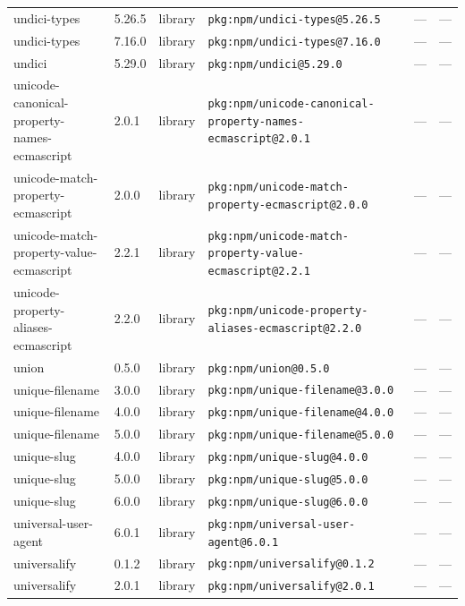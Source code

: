 \documentclass[11pt,a4paper]{article}
\begin{document}
\begin{longtable}{|p{4cm}|p{2cm}|p{1.6cm}|p{5cm}|p{1.5cm}|p{3.5cm}|}
\raggedright undici-types & 5.26.5 & library & \small\texttt{pkg:npm/undici-types@5.26.5} & — & \small — \\
\raggedright undici-types & 7.16.0 & library & \small\texttt{pkg:npm/undici-types@7.16.0} & — & \small — \\
\raggedright undici & 5.29.0 & library & \small\texttt{pkg:npm/undici@5.29.0} & — & \small — \\
\raggedright unicode-canonical-property-names-ecmascript & 2.0.1 & library & \small\texttt{pkg:npm/unicode-canonical-property-names-ecmascript@2.0.1} & — & \small — \\
\raggedright unicode-match-property-ecmascript & 2.0.0 & library & \small\texttt{pkg:npm/unicode-match-property-ecmascript@2.0.0} & — & \small — \\
\raggedright unicode-match-property-value-ecmascript & 2.2.1 & library & \small\texttt{pkg:npm/unicode-match-property-value-ecmascript@2.2.1} & — & \small — \\
\raggedright unicode-property-aliases-ecmascript & 2.2.0 & library & \small\texttt{pkg:npm/unicode-property-aliases-ecmascript@2.2.0} & — & \small — \\
\raggedright union & 0.5.0 & library & \small\texttt{pkg:npm/union@0.5.0} & — & \small — \\
\raggedright unique-filename & 3.0.0 & library & \small\texttt{pkg:npm/unique-filename@3.0.0} & — & \small — \\
\raggedright unique-filename & 4.0.0 & library & \small\texttt{pkg:npm/unique-filename@4.0.0} & — & \small — \\
\raggedright unique-filename & 5.0.0 & library & \small\texttt{pkg:npm/unique-filename@5.0.0} & — & \small — \\
\raggedright unique-slug & 4.0.0 & library & \small\texttt{pkg:npm/unique-slug@4.0.0} & — & \small — \\
\raggedright unique-slug & 5.0.0 & library & \small\texttt{pkg:npm/unique-slug@5.0.0} & — & \small — \\
\raggedright unique-slug & 6.0.0 & library & \small\texttt{pkg:npm/unique-slug@6.0.0} & — & \small — \\
\raggedright universal-user-agent & 6.0.1 & library & \small\texttt{pkg:npm/universal-user-agent@6.0.1} & — & \small — \\
\raggedright universalify & 0.1.2 & library & \small\texttt{pkg:npm/universalify@0.1.2} & — & \small — \\
\raggedright universalify & 2.0.1 & library & \small\texttt{pkg:npm/universalify@2.0.1} & — & \small — \\

\end{longtable}
\end{document}
